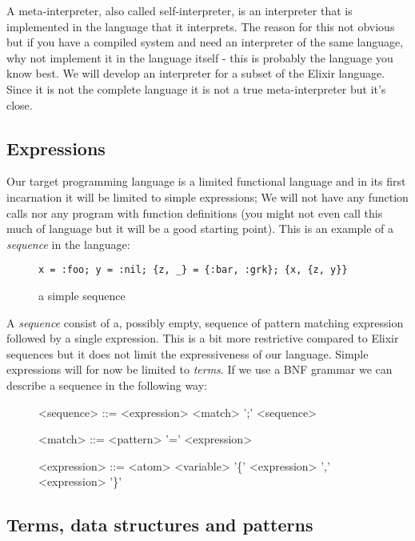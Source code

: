 \documentclass[a4paper,11pt]{article}
\begin{document}
A meta-interpreter, also called self-interpreter, is an interpreter
that is implemented in the language that it interprets. The reason for
this not obvious but if you have a compiled system and need an
interpreter of the same language, why not implement it in the language
itself - this is probably the language you know best. We will develop
an interpreter for a subset of the Elixir language. Since it is not the
complete language it is not a true meta-interpreter but it's close.

\subsection{Expressions}

Our target programming language is a limited functional language and
in its first incarnation it will be limited to simple expressions; We
will not have any function calls nor any program with function
definitions (you might not even call this much of language but it will
be a good starting point). This is an example of a {\em sequence} in
the language:

\begin{figure}[h]
\begin{verbatim}
x = :foo; y = :nil; {z, _} = {:bar, :grk}; {x, {z, y}}
\end{verbatim}
\caption{a simple sequence}
\label{fig:sequence}
\end{figure}

A {\em sequence} consist of a, possibly empty, sequence of pattern
matching expression followed by a single expression. This is a bit
more restrictive compared to Elixir sequences but it does not limit
the expressiveness of our language. Simple expressions will for now be
limited to {\em terms}. If we use a BNF grammar we can describe a
sequence in the following way:

\begin{figure}[h]
\begin{grammar}
<sequence> ::= <expression> \alt <match> ';' <sequence>

<match> ::= <pattern> '=' <expression> 

<expression> ::= <atom> \alt <variable> \alt '\{' <expression> ',' <expression> '\}'
\end{grammar}
\end{figure}

\subsection{Terms, data structures and patterns}
\end{document}

